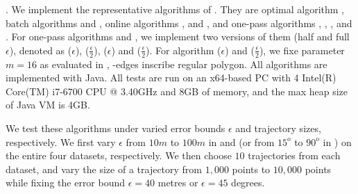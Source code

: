 


.
We implement the representative algorithms of .
 They are optimal algorithm \opt, batch algorithms \dpa and \tpa, online algorithms  \opwa, \bqsa and \squishe, and one-pass algorithms  \operb, \siped, \cised, \intersec and \interval.
For one-pass algorithms \siped and \cised, we implement two versions of them (half and full $\epsilon$), denoted as \siped($\epsilon$), \siped($\frac{\epsilon}{2}$), \cised($\epsilon$) and \cised($\frac{\epsilon}{2}$).
For algorithm \cised($\epsilon$) and \cised($\frac{\epsilon}{2}$), we fixe parameter $m=16$ as evaluated in \cite{Lin:Cised}, -edges inscribe regular polygon.
All algorithms are implemented with Java.
All tests are run on an x64-based  PC with 4 Intel(R) Core(TM) i7-6700 CPU @
3.40GHz  and 8GB of memory, and {the max heap size of Java VM is 4GB.}


We test these algorithms under varied error bounds $\epsilon$ and trajectory sizes, respectively. We first vary $\epsilon$ from $10m$ to $100m$ in \ped and \sed (or from $15^o$ to $90^o$ in \dad) on the entire four datasets, respectively. We then choose $10$ trajectories from each dataset, and vary the size  of a trajectory from $1,000$ points to $10,000$ points while fixing the error bound $\epsilon=40$ metres or $\epsilon=45$ degrees.

